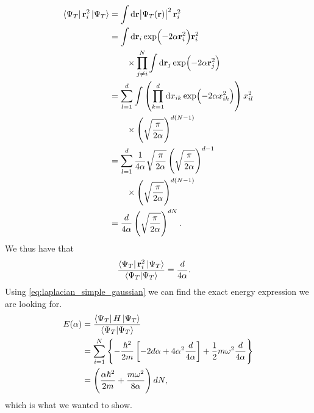 \documentclass[
    a4paper, aps, twocolumn, floatfix, superscriptaddress,
    nofootinbib]{revtex4-1}
\newcommand{\vf}{\mathbf}
\newcommand{\1}{\mathds{1}}
\newcommand{\para}[1]{\left(#1\right)}
\newcommand{\brak}[1]{\left[#1\right]}
\newcommand{\brac}[1]{\left\{#1\right\}}
\begin{document}
    \begin{align}
        \bra{\Psi_T}\vf{r}_i^2\ket{\Psi_T}
        &=
        \int\dd\vf{r}\abs{\Psi_T(\vf{r})}^2\vf{r}_i^2
        \\
        &=
        \int\dd\vf{r}_i\exp(-2\alpha\vf{r}_i^2)\vf{r}_i^2
        \nonumber \\
        &\qquad
        \times
        \prod_{j \neq i}^N
        \int\dd\vf{r}_j\exp(-2\alpha\vf{r}_j^2)
        \\
        &=
        \sum_{l = 1}^d
        \int
        \para{
            \prod_{k = 1}^d
            \dd x_{ik}\exp(-2\alpha x_{ik}^2)
        } x_{il}^2
        \nonumber\\
        &\qquad
        \times
        \para{
            \sqrt{\frac{\pi}{2\alpha}}
        }^{d(N - 1)}
        \\
        &=
        \sum_{l = 1}^d
        \frac{1}{4\alpha}\sqrt{\frac{\pi}{2\alpha}}
        \para{
            \sqrt{\frac{\pi}{2\alpha}}
        }^{d - 1}
        \nonumber\\
        &\qquad
        \times
        \para{
            \sqrt{\frac{\pi}{2\alpha}}
        }^{d(N - 1)}
        \\
        &= \frac{d}{4\alpha}\para{
            \sqrt{\frac{\pi}{2\alpha}}
        }^{dN}.
    \end{align}
    We thus have that
    \begin{align}
        \frac{\bra{\Psi_T}\vf{r}_i^2\ket{\Psi_T}}{\bra{\Psi_T}\ket{\Psi_T}}
        &=
        \frac{d}{4\alpha}.
    \end{align}
    Using \autoref{eq:laplacian_simple_gaussian} we can find the exact energy
    expression we are looking for.
    \begin{align}
        E(\alpha)
        &=
        \frac{\bra{\Psi_T}H\ket{\Psi_T}}{\bra{\Psi_T}\ket{\Psi_T}}
        \\
        &=
        \sum_{i = 1}^N
        \brac{
            -\frac{\hbar^2}{2m}
            \brak{
                -2d\alpha
                + 4\alpha^2\frac{d}{4\alpha}
            }
            + \frac{1}{2}m\omega^2\frac{d}{4\alpha}
        }
        \\
        &=
        \para{
            \frac{\alpha\hbar^2}{2m}
            + \frac{m\omega^2}{8\alpha}
        }dN,
    \end{align}
    which is what we wanted to show.
\end{document}

